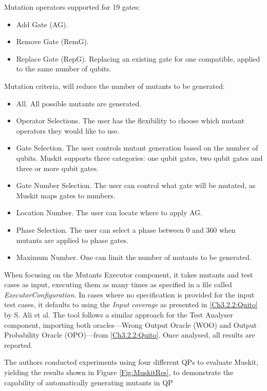 \begin{itemize}
Mutation operators supported for 19 gates:
\begin{itemize}
    \item Add Gate (AG).
    \item Remove Gate (RemG).
    \item Replace Gate (RepG). Replacing an existing gate for one compatible, applied to the same number of qubits.
\end{itemize}

Mutation criteria, will reduce the number of mutants to be generated:
\begin{itemize}
    \item All. All possible mutants are generated.
    \item Operator Selections. The user has the flexibility to choose which mutant operators they would like to use.
    \item Gate Selection. The user controls mutant generation based on the number of qubits. Muskit supports three categories: one qubit gates, two qubit gates and three or more qubit gates. 
    \item Gate Number Selection. The user can control what gate will be mutated, as Muskit maps gates to numbers.
    \item Location Number. The user can locate where to apply AG.
    \item Phase Selection. The user can select a phase between 0 and 360 when mutants are applied to phase gates.
    \item Maximum Number. One can limit the number of mutants to be generated.
\end{itemize}

When focusing on the Mutants Executor component, it takes mutants and test cases as input, executing them as many times as specified in a file called \textit{ExecutorConfiguration}. In cases where no specification is provided for the input test cases, it defaults to using the \textit{Input coverage} as presented in \ref{Ch3.2.2:Quito}\cite{ali2021assessing} by S. Ali et al. The tool follows a similar approach for the Test Analyser component, importing both oracles—Wrong Output Oracle (WOO) and Output Probability Oracle (OPO)—from \ref{Ch3.2.2:Quito}\cite{ali2021assessing}. Once analysed, all results are reported.\newline

The authors conducted experiments using four different QPs to evaluate Muskit, yielding the results shown in Figure \ref{Fig:MuskitRes}, to demonstrate the capability of automatically generating mutants in QP


\end{itemize}
